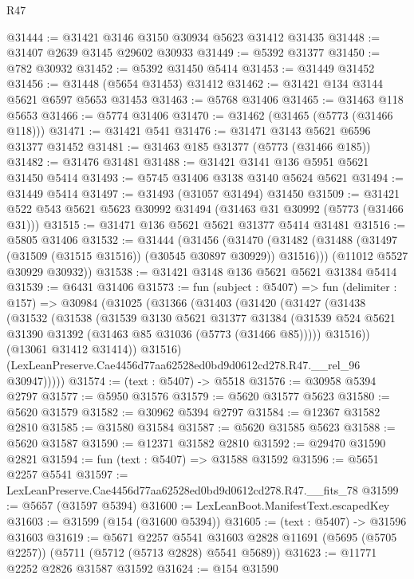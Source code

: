 \begin{lexlean}{R47}
\begin{coremodule}
@31444 := @31421 @3146 @3150 @30934 @5623 @31412 @31435
@31448 := @31407 @2639 @3145 @29602 @30933
@31449 := @5392 @31377
@31450 := @782 @30932
@31452 := @5392 @31450 @5414
@31453 := @31449 @31452
@31456 := @31448 (@5654 @31453) @31412
@31462 := @31421 @134 @3144 @5621 @6597 @5653 @31453
@31463 := @5768 @31406
@31465 := @31463 @118 @5653
@31466 := @5774 @31406
@31470 := @31462 (@31465 (@5773 (@31466 @118)))
@31471 := @31421 @541
@31476 := @31471 @3143 @5621 @6596 @31377 @31452
@31481 := @31463 @185 @31377 (@5773 (@31466 @185))
@31482 := @31476 @31481
@31488 := @31421 @3141 @136 @5951 @5621 @31450 @5414
@31493 := @5745 @31406 @3138 @3140 @5624 @5621
@31494 := @31449 @5414
@31497 := @31493 (@31057 @31494) @31450
@31509 := @31421 @522 @543 @5621 @5623 @30992 @31494 (@31463 @31 @30992 (@5773 (@31466 @31)))
@31515 := @31471 @136 @5621 @5621 @31377 @5414 @31481
@31516 := @5805 @31406
@31532 := @31444
    (@31456
      (@31470 (@31482 (@31488 (@31497 (@31509 (@31515 @31516)) (@30545 @30897 @30929)) @31516)))
      (@11012 @5527 @30929 @30932))
@31538 := @31421 @3148 @136 @5621 @5621 @31384 @5414
@31539 := @6431 @31406
@31573 := fun (subject : @5407) =>
  fun (delimiter : @157) =>
  @30984
    (@31025
      (@31366
        (@31403
          (@31420
            (@31427
              (@31438
                (@31532
                  (@31538
                    (@31539
                      @3130
                      @5621
                      @31377
                      @31384
                      (@31539 @524 @5621 @31390 @31392 (@31463 @85 @31036 (@5773 (@31466 @85)))))
                    @31516))
                (@13061 @31412 @31414))
              @31516)
            (LexLeanPreserve.Cae4456d77aa62528ed0bd9d0612cd278.R47.__rel_96 @30947)))))
@31574 := (text : @5407) -> @5518
@31576 := @30958 @5394 @2797
@31577 := @5950 @31576
@31579 := @5620 @31577 @5623
@31580 := @5620 @31579
@31582 := @30962 @5394 @2797
@31584 := @12367 @31582 @2810
@31585 := @31580 @31584
@31587 := @5620 @31585 @5623
@31588 := @5620 @31587
@31590 := @12371 @31582 @2810
@31592 := @29470 @31590 @2821
@31594 := fun (text : @5407) => @31588 @31592
@31596 := @5651 @2257 @5541
@31597 := LexLeanPreserve.Cae4456d77aa62528ed0bd9d0612cd278.R47.__fits_78
@31599 := @5657 (@31597 @5394)
@31600 := LexLeanBoot.ManifestText.escapedKey
@31603 := @31599 (@154 (@31600 @5394))
@31605 := (text : @5407) -> @31596 @31603
@31619 := @5671
    @2257
    @5541
    @31603
    @2828
    @11691
    (@5695 (@5705 @2257))
    (@5711 (@5712 (@5713 @2828) @5541 @5689))
@31623 := @11771 @2252 @2826 @31587 @31592
@31624 := @154 @31590

\end{coremodule}
\end{lexlean}
